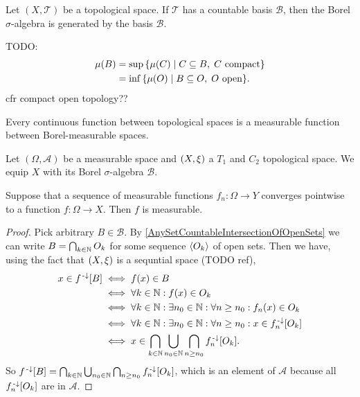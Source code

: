 \begin{lemma}
Let $(X,\mathcal{T})$ be a topological space. If $\mathcal{T}$ has a countable basis $\mathcal{B}$, then the Borel $\sigma$-algebra is generated by the basis $\mathcal{B}$.
\end{lemma}

TODO:
\begin{align*}
\mu(B) &= \sup\setbuilder{\mu(C)}{C\subseteq B, \; \text{$C$ compact}} \\
&= \inf\setbuilder{\mu(O)}{B\subseteq O, \; \text{$O$ open}}.
\end{align*}
cfr compact open topology??

\begin{lemma}
Every continuous function between topological spaces is a measurable function between Borel-measurable spaces.
\end{lemma}

\begin{proposition} \label{pointWiseConvergenceMeasurable}
Let $(\Omega,\mathcal{A})$ be a measurable space and $\left( X,\xi \right)$ a $T_1$ and $C_2$ topological space. We equip $X$ with its Borel $\sigma$-algebra $\mathcal{B}$.

Suppose that a sequence of measurable functions $f_n : \Omega \to Y$ converges pointwise to a function $f:\Omega\to X$. Then $f$ is measurable.
\end{proposition}
\begin{proof}
Pick arbitrary $B\in \mathcal{B}$. By \ref{AnySetCountableIntersectionOfOpenSets} we can write $B = \bigcap_{k\in\mathbb{N}}O_k$ for some sequence $\left\langle O_k \right\rangle$ of open sets. Then we have, using the fact that $\left( X,\xi \right)$ is a sequntial space (TODO ref),
\begin{align*}
x\in f^{{\text{\hspace{0.15em}-}\downarrow}}[B] &\iff f(x)\in B \\
&\iff \forall k\in\mathbb{N}: f(x)\in O_k\\
&\iff \forall k\in\mathbb{N}: \exists n_0\in\mathbb{N}: \forall n\geq n_0: f_n(x)\in O_k \\
&\iff \forall k\in\mathbb{N}: \exists n_0\in\mathbb{N}: \forall n\geq n_0: x\in f^{{\text{\hspace{0.15em}-}\downarrow}}_n[O_k] \\
&\iff x\in \bigcap_{k\in\mathbb{N}}\bigcup_{n_0\in\mathbb{N}}\bigcap_{n\geq n_0}f^{{\text{\hspace{0.15em}-}\downarrow}}_n[O_k].
\end{align*}
So $f^{{\text{\hspace{0.15em}-}\downarrow}}[B] = \bigcap_{k\in\mathbb{N}}\bigcup_{n_0\in\mathbb{N}}\bigcap_{n\geq n_0}f^{{\text{\hspace{0.15em}-}\downarrow}}_n[O_k]$, which is an element of $\mathcal{A}$ because all $f^{{\text{\hspace{0.15em}-}\downarrow}}_n[O_k]$ are in $\mathcal{A}$.
\end{proof}

